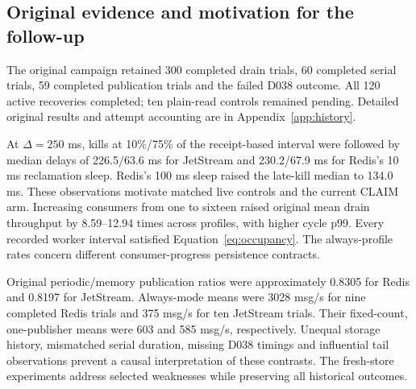 \subsection{Original evidence and motivation for the follow-up}

The original campaign retained 300 completed drain trials, 60 completed serial trials, 59 completed publication trials and the failed D038 outcome. All 120 active recoveries completed; ten plain-read controls remained pending. Detailed original results and attempt accounting are in Appendix~\ref{app:history}.

At $\Delta=250$ ms, kills at 10\%/75\% of the receipt-based interval were followed by median delays of 226.5/63.6 ms for JetStream and 230.2/67.9 ms for Redis's 10 ms reclamation sleep. Redis's 100 ms sleep raised the late-kill median to 134.0 ms. These observations motivate matched live controls and the current CLAIM arm. Increasing consumers from one to sixteen raised original mean drain throughput by 8.59--12.94 times across profiles, with higher cycle p99. Every recorded worker interval satisfied Equation~\ref{eq:occupancy}. The always-profile rates concern different consumer-progress persistence contracts.

Original periodic/memory publication ratios were approximately 0.8305 for Redis and 0.8197 for JetStream. Always-mode means were 3028 msg/s for nine completed Redis trials and 375 msg/s for ten JetStream trials. Their fixed-count, one-publisher means were 603 and 585 msg/s, respectively. Unequal storage history, mismatched serial duration, missing D038 timings and influential tail observations prevent a causal interpretation of these contrasts. The fresh-store experiments address selected weaknesses while preserving all historical outcomes.


